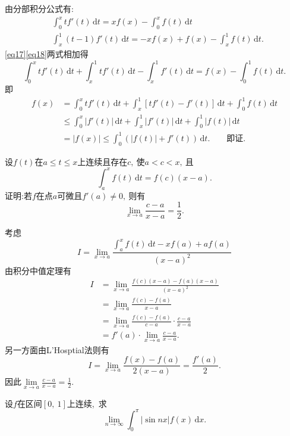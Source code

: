 	\begin{solution}
		由分部积分公式有:
		\begin{align}
			&\int_{0}^{x}tf'(t)\,\text{d}t=xf(x)-\int_{0}^{x}f(t)\,\text{d}t\label{eq17}\\
			&\int_{x}^{1}(t-1)f'(t)\,\text{d}t=-xf(x)+f(x)-\int_{x}^{1}f(t)\,\text{d}t.\label{eq18}
		\end{align}
		\eqref{eq17}\eqref{eq18}两式相加得
		$$\int_{0}^{x}tf'(t)\,\text{d}t+\int_{x}^{1}tf'(t)\,\text{d}t-\int_{x}^{1}f'(t)\,\text{d}t=f(x)-\int_{0}^{1}f(t)\,\text{d}t.$$
		即
		\begin{align*}
			f(x)&=\int_{0}^{x}tf'(t)\,\text{d}t+\int_{x}^{1}\left[tf'(t)-f'(t)\right]\,\text{d}t+\int_{0}^{1}f(t)\,\text{d}t\\
			&\le \int_{0}^{x}|f'(t)|\,\text{d}t+\int_{x}^{1}|f'(t)|\,\text{d}t+\int_{0}^{1}|f(t)|\,\text{d}t\\
			&=\left|f(x)\right|\le \int_{0}^{1}\left(|f(t)|+f'(t)\right)\,\text{d}t.\qquad \text{即证}.
		\end{align*} 
	\end{solution}
	\newpage
	\begin{problem}
		设$f(t)$在$a\le t\le x$上连续且存在$c,\ $使$a<c<x,\ $且
		$$\int_{a}^{x}f(t)\,\text{d}t=f(c)(x-a).$$
		证明:若$f$在点$a$可微且$f'(a)\neq 0,\ $则有
		$$\lim\limits_{x\rightarrow a}\frac{c-a}{x-a}=\frac{1}{2}.$$
	\end{problem}
	
	\begin{solution}
		考虑
		$$I=\lim\limits_{x\rightarrow a}\frac{\int_{a}^{x}f(t)\,\text{d}t-xf(a)+af(a)}{(x-a)^2}$$
		由积分中值定理有
		\begin{align*}
			I&=\lim\limits_{x\rightarrow a}\frac{f(c)(x-a)-f(a)(x-a)}{(x-a)^2}\\
			&=\lim\limits_{x\rightarrow a}\frac{f(c)-f(a)}{x-a}\\
			&=\lim\limits_{x\rightarrow a}\frac{f(c)-f(a)}{c-a}\cdot\frac{c-a}{x-a}\\
			&=f'(a)\cdot\lim\limits_{x\rightarrow a}\frac{c-a}{x-a}.
		\end{align*}
		另一方面由L'Hosptial法则有
		$$I=\lim\limits_{x\rightarrow a}\frac{f(x)-f(a)}{2(x-a)}=\frac{f'(a)}{2}.$$
		因此$\lim\limits_{x\rightarrow a}\frac{c-a}{x-a}=\frac{1}{2}.$ 
	\end{solution}
	\newpage
	\begin{problem}
		设$f$在区间$\left[0,\ 1\right]$上连续,\ 求
		$$\lim\limits_{n\rightarrow\infty}\int_{0}^{\pi}\left|\sin nx\right|f(x)\,\text{d}x.$$
	\end{problem}
	
